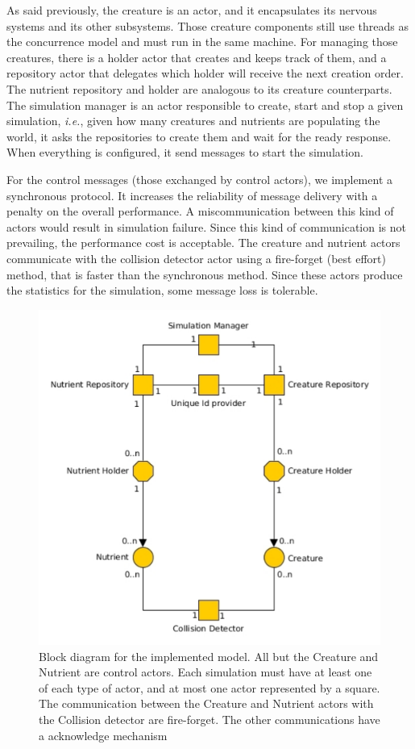 \documentclass[runningheads]{llncs}
\begin{document}
As said previously, the creature is an actor, and it encapsulates its nervous systems and its other subsystems. Those creature components still use threads as the concurrence model and must run in the same machine. For managing those creatures, there is a holder actor that creates and keeps track of them, and a repository actor that delegates which holder will receive the next creation order. The nutrient repository and holder are analogous to its creature counterparts. The simulation manager is an actor responsible to create, start and stop a given simulation, \textit{i.e.}, given how many creatures and nutrients are populating the world, it asks the repositories to create them and wait for the ready response. When everything is configured, it send messages to start the simulation.

For the control messages (those exchanged by control actors), we implement a synchronous protocol. It increases the reliability of message delivery with a penalty on the overall performance. A miscommunication between this kind of actors would result in simulation failure. Since this kind of communication is not prevailing, the performance cost is acceptable. The creature and nutrient actors communicate with the collision detector actor using a fire-forget (best effort) method, that is faster than the synchronous method. Since these actors produce the statistics for the simulation, some message loss is tolerable.


\begin{figure}
	\centering
	\includegraphics[width=14cm]{diagramaAtores}
	\caption{Block diagram for the implemented model. All but the Creature and Nutrient are control actors. Each simulation must have at least one of each type of actor, and at most one actor represented by a square. The communication between the Creature and Nutrient actors with the Collision detector are fire-forget. The other communications have a acknowledge mechanism}
	\label{diagramaAtores}
\end{figure}
\end{document}
